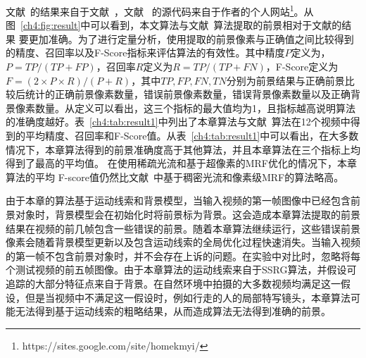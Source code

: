 文献~的结果来自于文献~，文献~ 的源代码来自于作者的个人网站\footnote{https://sites.google.com/site/homekmyi/}。从图~\ref{ch4:fig:result}中可以看到，本文算法与文献~算法提取的前景相对于文献\cite{kwak2011Generalized,5.8s}的结果 要更加准确。为了进行定量分析，使用提取的前景像素与正确值之间比较得到的精度、召回率以及F-Score指标来评估算法的有效性。其中精度$P$定义为，
$ P = TP/(TP+FP)$，召回率$R$定义为$R = TP/(TP+FN)$，F-Score定义为$F = (2 \times P \times R)/(P + R)$，其中$TP,FP,FN,TN$分别为前景结果与正确前景比较后统计的正确前景像素数量，错误前景像素数量，错误背景像素数量以及正确背景像素数量。从定义可以看出，这三个指标的最大值均为1，且指标越高说明算法的准确度越好。表~\ref{ch4:tab:result1}中列出了本章算法与文献~算法在12个视频中得到的平均精度、召回率和F-Score值。从表~\ref{ch4:tab:result1}中可以看出，在大多数情况下，本章算法得到的前景准确度高于其他算法，并且本章算法在三个指标上均得到了最高的平均值。 在使用稀疏光流和基于超像素的MRF优化的情况下，本章算法的平均 F-score值仍然比文献~中基于稠密光流和像素级MRF的算法略高。\par

由于本章的算法基于运动线索和背景模型，当输入视频的第一帧图像中已经包含前景对象时，背景模型会在初始化时将前景标为背景。这会造成本章算法提取的前景结果在视频的前几帧包含一些错误的前景。随着本章算法继续运行，这些错误前景像素会随着背景模型更新以及包含运动线索的全局优化过程快速消失。当输入视频的第一帧不包含前景对象时，并不会存在上诉的问题。在实验中对比时，忽略将每个测试视频的前五帧图像。由于本章算法的运动线索来自于SSRG算法，并假设可追踪的大部分特征点来自于背景。在自然环境中拍摄的大多数视频均满足这一假设，但是当视频中不满足这一假设时，例如行走的人的局部特写镜头，本章算法可能无法得到基于运动线索的粗略结果，从而造成算法无法得到准确的前景。\par


